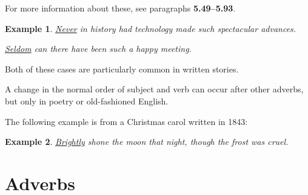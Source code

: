 \documentclass[oneside]{book}
\numberwithin{equation}{section}
\newtheorem{example}{Example}[section]
\begin{document}
For more information about these, see paragraphs \textbf{5.49--5.93}.
\begin{example}
    \underline{Never} in history had technology made such spectacular advances.
    
    \underline{Seldom} can there have been such a happy meeting.
\end{example}
Both of these cases are particularly common in written stories.

A change in the normal order of subject and verb can occur after other adverbs, but only in poetry or old-fashioned English.

The following example is from a Christmas carol written in 1843:
\begin{example}
    \underline{Brightly} shone the moon that night, though the frost was cruel.
\end{example}

\section{Adverbs}
\end{document}
